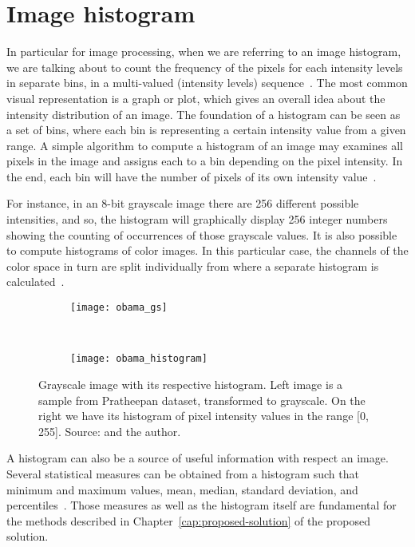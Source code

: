 \section{Image histogram}
\label{sec:image_histogram}
In particular for image processing, when we are referring to an image histogram, we are talking about to count the frequency of the pixels for each intensity levels in separate bins, in a multi-valued (intensity levels) sequence~\citep{fisher:03}. The most common visual representation is a graph or plot, which gives an overall idea about the intensity distribution of an image. The foundation of a histogram can be seen as a set of bins, where each bin is representing a certain intensity value from a given range. A simple algorithm to compute a histogram of an image may examines all pixels in the image and assigns each to a bin depending on the pixel intensity. In the end, each bin will have the number of pixels of its own intensity value~\citep{gonzalez:02}.

For instance, in an 8-bit grayscale image there are 256 different possible intensities, and so, the histogram will graphically display 256 integer numbers showing the counting of occurrences of those grayscale values. It is also possible to compute histograms of color images. In this particular case, the channels of the color space in turn are split individually from where a separate histogram is calculated~\citep{fisher:03}.

\begin{figure}[H]
    \centering
    \begin{subfigure}[t]{0.4\textwidth}
        \texttt{[image: obama\_gs]}
    \end{subfigure}
    ~
    \begin{subfigure}[t]{0.54\textwidth}
        \texttt{[image: obama\_histogram]}
    \end{subfigure}
    \caption[Grayscale image with its respective histogram]{Grayscale image with its respective histogram. Left image is a sample from Pratheepan dataset, transformed to grayscale. On the right we have its histogram of pixel intensity values in the range [0, 255]. Source: \citet{tan:12} and the author.}
    \label{fig:obama_hist}
\end{figure}

A histogram can also be a source of useful information with respect an image. Several statistical measures can be obtained from a histogram such that minimum and maximum values, mean, median, standard deviation, and percentiles~\citep{pedrini:08}. Those measures as well as the histogram itself are fundamental for the methods described in Chapter~\ref{cap:proposed-solution} of the proposed solution.


